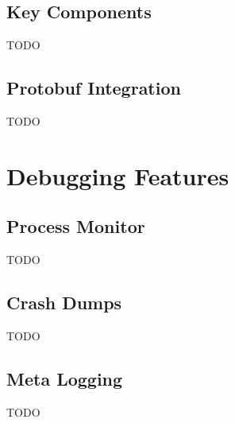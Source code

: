 \subsection{Key Components}

TODO

\subsection{Protobuf Integration}

TODO


\section{Debugging Features}

\subsection{Process Monitor}

TODO

\subsection{Crash Dumps}

TODO

\subsection{Meta Logging}

TODO
